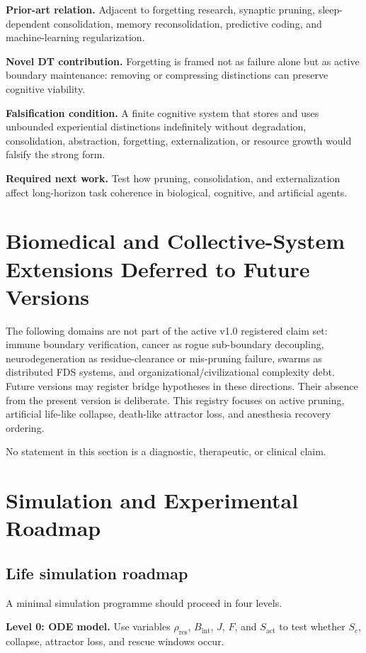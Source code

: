 \documentclass[10pt,a4paper,twocolumn,aps,prl]{revtex4-2}
\theoremstyle{claimstyle}
\theoremstyle{definition}
\newcommand{\FDS}{FDS}
\newcommand{\claimfield}[1]{\noindent\textbf{#1.}}
\newcommand{\Sactive}{S_{\mathrm{act}}}
\newcommand{\rhodebt}{\rho_{\mathrm{res}}}
\newcommand{\Bint}{B_{\mathrm{int}}}
\newcommand{\Jflow}{J}
\begin{document}
\claimfield{Prior-art relation} Adjacent to forgetting research, synaptic pruning, sleep-dependent consolidation, memory reconsolidation, predictive coding, and machine-learning regularization.

\claimfield{Novel DT contribution} Forgetting is framed not as failure alone but as active boundary maintenance: removing or compressing distinctions can preserve cognitive viability.

\claimfield{Falsification condition} A finite cognitive system that stores and uses unbounded experiential distinctions indefinitely without degradation, consolidation, abstraction, forgetting, externalization, or resource growth would falsify the strong form.

\claimfield{Required next work} Test how pruning, consolidation, and externalization affect long-horizon task coherence in biological, cognitive, and artificial agents.

\section{Biomedical and Collective-System Extensions Deferred to Future Versions}

The following domains are not part of the active v1.0 registered claim set: immune boundary verification, cancer as rogue sub-boundary decoupling, neurodegeneration as residue-clearance or mis-pruning failure, swarms as distributed \FDS{} systems, and organizational/civilizational complexity debt. Future versions may register bridge hypotheses in these directions. Their absence from the present version is deliberate. This registry focuses on active pruning, artificial life-like collapse, death-like attractor loss, and anesthesia recovery ordering.

No statement in this section is a diagnostic, therapeutic, or clinical claim.

\section{Simulation and Experimental Roadmap}

\subsection{Life simulation roadmap}

A minimal simulation programme should proceed in four levels.

\claimfield{Level 0: ODE model} Use variables $\rhodebt$, $\Bint$, $\Jflow$, $F$, and $\Sactive$ to test whether $S_c$, collapse, attractor loss, and rescue windows occur.
\end{document}
